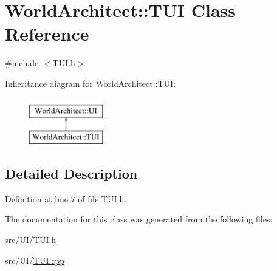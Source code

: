 \hypertarget{class_world_architect_1_1_t_u_i}{}\section{World\+Architect\+::T\+UI Class Reference}
\label{class_world_architect_1_1_t_u_i}


{\ttfamily \#include $<$T\+U\+I.\+h$>$}

Inheritance diagram for World\+Architect\+::T\+UI\+:\begin{figure}[H]
\begin{center}
\leavevmode
\includegraphics[height=2.000000cm]{class_world_architect_1_1_t_u_i}
\end{center}
\end{figure}


\subsection{Detailed Description}


Definition at line 7 of file T\+U\+I.\+h.



The documentation for this class was generated from the following files\+:\begin{DoxyCompactItemize}
\item 
src/\+U\+I/\mbox{\hyperlink{_t_u_i_8h}{T\+U\+I.\+h}}\item 
src/\+U\+I/\mbox{\hyperlink{_t_u_i_8cpp}{T\+U\+I.\+cpp}}\end{DoxyCompactItemize}

